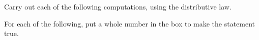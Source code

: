 \begin{examples}
    \begin{questions}
        \Question[3] Carry out each of the following computations, using the distributive law.
        \Question[4] For each of the following, put a whole number in the box to make the statement true.
    \end{questions}
\end{examples}


